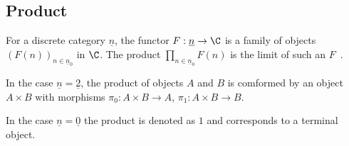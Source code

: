 \subsection{Product}

\begin{definition}[Product]\label{def:product_limit}

	For a discrete category $\underline{n}$, the functor $F:\underline{n}\to \C$
	is a family of objects $(F(n))_{n\in \underline{n}_0}$ in $\C$. The product
	$\prod\limits_{n\in \underline{n}_0} F(n)$ is the limit of such an
	$F$~\parencite[p.~108]{leinster:basic_category_theory}.
\end{definition}

\begin{remark}
	In the case $\underline{n}=\underline{2}$, the product of objects $A$ and $B$
	is comformed by an object $A\times B$ with morphisms $\pi_0:A\times B\to A$,
	$\pi_1: A\times B \to B$.
\end{remark}

\begin{remark}
	In the case $\underline{n}=\underline{0}$ the product is denoted as $1$
	and corresponds to a terminal object.
\end{remark}




